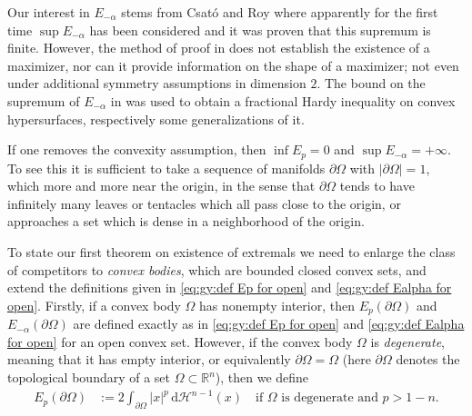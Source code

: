 \documentclass[10pt,leqno]{amsart}
\newcommand{\R}[0]{\mathbb{R}}
\newcommand{\dd}{\, \mathrm{d}}
\newcommand{\Hau}{\mathcal{H}}
\newcommand{\delomega}{\partial\Omega}
\numberwithin{Theorem}{section}
\theoremstyle{definition}
\theoremstyle{remark}
\numberwithin{equation}{section}
\numberwithin{equation}{section}
\begin{document}
Our interest in $E_{-\alpha}$ stems from Csat\'o and Roy \cite{Csato2024} where apparently  for the first time $\sup E_{-\alpha}$ has been considered and it was proven that this supremum is finite. However, the method of proof in  \cite{Csato2024} does not establish the existence of a maximizer, nor can it provide information on the shape of a maximizer; not even under additional symmetry assumptions in dimension $2$.
The bound on the supremum of $E_{-\alpha}$ in \cite{Csato2024} was used to obtain a fractional Hardy inequality on convex hypersurfaces, respectively some generalizations of it.



If one removes the convexity assumption, then $\inf E_p=0$ and $\sup E_{-\alpha}=+\infty.$ To see this it is sufficient to take a sequence of manifolds  $\partial\Omega$ with $|\partial\Omega|=1$, which  more and more near the origin, in the sense that  $\partial\Omega$ tends to have infinitely many leaves or tentacles which all pass close to the origin, or approaches a set which is dense in a neighborhood of the origin.




To state our first theorem on existence of extremals we need to enlarge the class of competitors  to \textit{convex bodies}, which are bounded closed convex sets, and extend the definitions given in \eqref{eq:gy:def Ep for open} and \eqref{eq:gy:def Ealpha for open}. Firstly, if a convex body $\Omega$ has nonempty interior, then  $E_p(\delomega)$ and $E_{-\alpha}(\delomega)$ are defined exactly as in \eqref{eq:gy:def Ep for open} and \eqref{eq:gy:def Ealpha for open} for an open convex set. However, if the convex body $\Omega$ is \textit{degenerate}, meaning that it has empty interior, or equivalently $\delomega=\Omega$ (here $\delomega$ denotes the topological boundary of a set $\Omega\subset\R^n$), then we define
\begin{align}\label{eq:def degenerate Ep}
  E_p(\partial\Omega)&:=2\int_{\partial\Omega}|x|^p \dd \Hau^{n-1}(x) \quad \text{if $\Omega$ is degenerate and $p>1-n.$}  
\end{align} 
\end{document}
